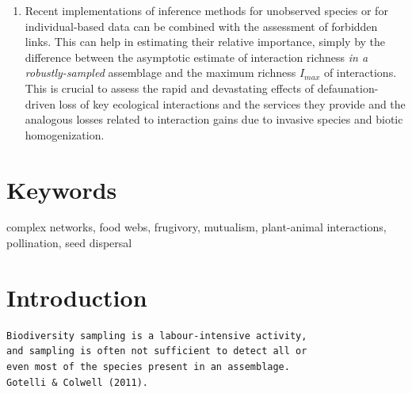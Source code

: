 \documentclass[12pt]{article}
\begin{document}
\begin{enumerate}
\item Recent implementations of inference methods for unobserved species or for individual-based data can be combined with the assessment of forbidden links. This can help in estimating their relative importance, simply by the difference between the asymptotic estimate of interaction richness \emph{in a robustly-sampled} assemblage and the maximum richness $I_{max}$ of interactions. This is crucial to assess the rapid and devastating effects of defaunation-driven loss of key ecological interactions and the services they provide and the analogous losses related to interaction gains due to invasive species and biotic homogenization.
\end{enumerate}
%
\section*{Keywords}
complex networks, food webs, frugivory, mutualism, plant-animal interactions, pollination, seed dispersal
\section*{Introduction}
\label{introduction}
\begin{verbatim}
Biodiversity sampling is a labour-intensive activity,   
and sampling is often not sufficient to detect all or   
even most of the species present in an assemblage.   
Gotelli & Colwell (2011).
\end{verbatim}
\end{document}
